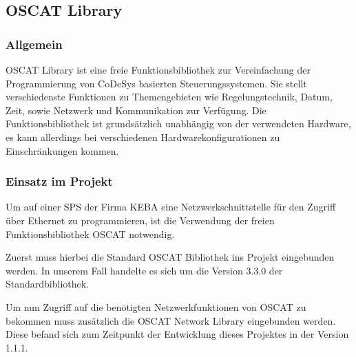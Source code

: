 \subsection{OSCAT Library}

\subsubsection{Allgemein}
OSCAT Library ist eine freie Funktionsbibliothek zur Vereinfachung der Programmierung von CoDeSys basierten Steuerungssystemen. Sie stellt verschiedenste Funktionen zu Themengebieten wie Regelungstechnik, Datum, Zeit, sowie Netzwerk und Kommunikation zur Verfügung. Die Funktionsbibliothek ist grundsätzlich unabhängig von der verwendeten Hardware, es kann allerdings bei verschiedenen Hardwarekonfigurationen zu Einschränkungen kommen.

\subsubsection{Einsatz im Projekt}
Um auf einer SPS der Firma KEBA eine Netzwerkschnittstelle für den Zugriff über Ethernet zu programmieren, ist die Verwendung der freien Funktionsbibliothek OSCAT notwendig. 

Zuerst muss hierbei die Standard OSCAT Bibliothek ins Projekt eingebunden werden. In unserem Fall handelte es sich um die Version 3.3.0 der Standardbibliothek.

Um nun Zugriff auf die benötigten Netzwerkfunktionen von OSCAT zu bekommen muss zusätzlich die OSCAT Network Library eingebunden werden. Diese befand sich zum Zeitpunkt der Entwicklung dieses Projektes in der Version 1.1.1. 

